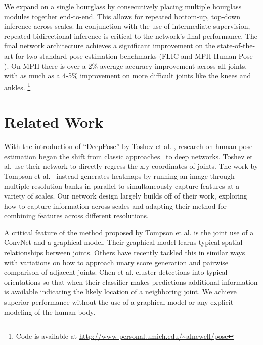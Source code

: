 \documentclass[runningheads]{llncs}
\begin{document}
We expand on a single hourglass by consecutively placing multiple
hourglass modules together end-to-end. This allows for repeated
bottom-up, top-down inference across scales. In conjunction with the
use of intermediate supervision, repeated bidirectional inference is
critical to the network's final performance. The final network
architecture achieves a significant improvement on the
state-of-the-art for two standard pose estimation benchmarks (FLIC
\cite{sapp2013modec} and MPII Human Pose \cite{andriluka20142d}). On
MPII there is over a 2\% average accuracy improvement across all
joints, with as much as a 4-5\% improvement on more difficult joints
like the knees and ankles. \footnote{Code is available at
  \url{http://www-personal.umich.edu/~alnewell/pose}}


\section{Related Work}

With the introduction of ``DeepPose'' by Toshev et
al. \cite{toshev2014deeppose}, research on human pose estimation began
the shift from classic approaches~\cite{felz08, pish13strong,
  bourdev2009poselets, sapp2013modec, johnson2011learning,
  ramanan2006learning, yang2013articulated, ferrari2008progressive,
  ladicky2013human} to deep networks.  Toshev et al. use their network
to directly regress the x,y coordinates of joints. The work by Tompson
et al.~\cite{tompson2014joint} instead generates heatmaps by running
an image through multiple resolution banks in parallel to
simultaneously capture features at a variety of scales. Our network
design largely builds off of their work, exploring how to capture
information across scales and adapting their method for combining
features across different resolutions.

A critical feature of the method proposed by Tompson et
al. \cite{tompson2014joint} is the joint use of a ConvNet and a
graphical model. Their graphical model learns typical spatial
relationships between joints. Others have recently tackled this in
similar ways \cite{fan2015combining, chen2014articulated,
  pish15deepcut} with variations on how to approach unary score
generation and pairwise comparison of adjacent joints. Chen et
al. \cite{chen2014articulated} cluster detections into typical
orientations so that when their classifier makes predictions
additional information is available indicating the likely location of
a neighboring joint. We achieve superior performance without the use
of a graphical model or any explicit modeling of the human body.
\end{document}
